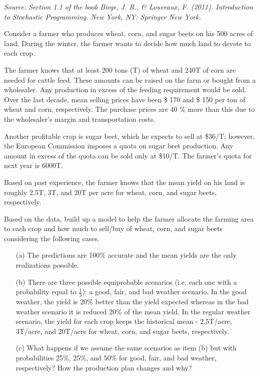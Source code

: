 \textit{Source: Section 1.1 of the book Birge, J. R., \& Louveaux, F. (2011). Introduction to Stochastic Programming. New York, NY: Springer New York.}

Consider a farmer who produces wheat, corn, and sugar beets on his 500 acres of land. During the winter, the farmer wants to decide 
how much land to devote to each crop. 

The farmer knows that at least 200 tons (T) of wheat and 240T of corn are needed for cattle feed. 
These amounts can be raised on the farm or bought from a wholesaler. Any production in excess of the feeding requirement would be sold. Over the last decade, mean selling prices have been \$ 170 and \$ 150 per ton of wheat and corn, respectively. The purchase prices are 40 \% more than this due to the wholesaler's margin and transportation costs.

Another profitable crop is sugar beet, which he expects to sell at \$36/T; however, the European Commission imposes a quota on sugar beet 
production. Any amount in excess of the quota can be sold only at \$10/T. The farmer’s quota for next year is 6000T.

Based on past experience, the farmer knows that the mean yield on his land is
roughly 2.5T, 3T, and 20T per acre for wheat, corn, and sugar beets, respectively.

Based on the data, build up a model to help the farmer allocate the farming area to each crop and how much to sell/buy of wheat, corn, 
and sugar beets considering the following cases.

\begin{itemize}
	\item[(a)] The predictions are 100\% accurate and the mean yields are the only realizations possible.	
	\item[(b)] There are three possible equiprobable scenarios (i.e, each one with a probability equal to $\frac{1}{3}$): a good, fair, and bad weather scenario. In the good weather, the yield is 20\% better than the yield expected whereas in the bad weather scenario it is reduced 20\% of the mean yield. In the regular weather scenario, the yield for each crop keeps the historical mean - 2.5T/acre, 3T/acre, and 20T/acre for wheat, corn, and sugar beets, respectively.
	\item[(c)]	What happens if we assume the same scenarios as item (b) but with probabilities 25\%, 25\%, and 50\% for good, fair, and bad weather, respectively? How the production plan changes and why?	
\end{itemize}
